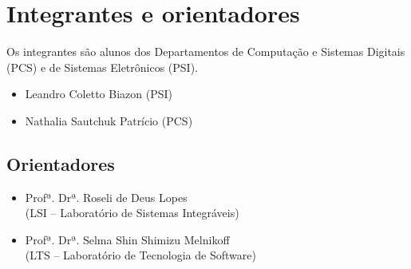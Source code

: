 \documentclass[a4paper,12pt,font=plain,header=plain]{abnt}
\begin{document}
  \section{Integrantes e orientadores}
    Os integrantes são alunos dos Departamentos de Computação e Sistemas Digitais
    (PCS) e de Sistemas Eletrônicos (PSI).

    \begin{itemize}
      \item Leandro Coletto Biazon (PSI)
      \item Nathalia Sautchuk Patrício (PCS)
    \end{itemize}

    \subsection{Orientadores}
    \begin{itemize}
    \item{
      Profª. Drª. Roseli de Deus Lopes \\
      (LSI – Laboratório de Sistemas Integráveis)
    }
    \item{
      Profª. Drª. Selma Shin Shimizu Melnikoff \\
      (LTS – Laboratório de Tecnologia de Software)
    }
    \end{itemize}

  {}
  
\end{document}
